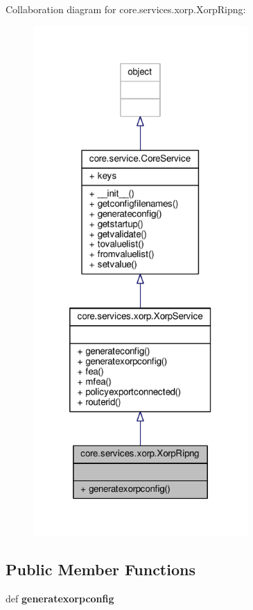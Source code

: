 Collaboration diagram for core.\+services.\+xorp.\+Xorp\+Ripng\+:
\nopagebreak
\begin{figure}[H]
\begin{center}
\leavevmode
\includegraphics[height=550pt]{classcore_1_1services_1_1xorp_1_1_xorp_ripng__coll__graph}
\end{center}
\end{figure}
\subsection*{Public Member Functions}
\begin{DoxyCompactItemize}
\item 
\hypertarget{classcore_1_1services_1_1xorp_1_1_xorp_ripng_af9bc144e801ae13e3ddf241da03710b5}{def {\bfseries generatexorpconfig}}\label{classcore_1_1services_1_1xorp_1_1_xorp_ripng_af9bc144e801ae13e3ddf241da03710b5}

\end{DoxyCompactItemize}
